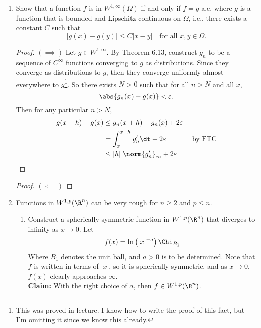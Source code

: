 \documentclass[12pt,letterpaper]{article}
\renewcommand{\epsilon}{\varepsilon}
\begin{document}
\begin{enumerate}
\pagebreak
\item Show that a function $f$ is in $W^{1,\infty}(\Omega)$ if and only if $f=g$ a.e. where $g$ is a function that is bounded and Lipschitz continuous on $\Omega$, i.e., there exists a constant $C$ such that
$$|g(x)-g(y)|\leq C|x-y| \quad \text{for all } x,y\in\Omega.$$

\begin{proof}$(\implies)$
Let $g\in W^{1,\infty}$. By Theorem 6.13, construct $g_n$ to be a sequence of $C^\infty$ functions converging to $g$ as distributions. Since they converge as distributions to $g$, then they converge uniformly almost everywhere to $g$\footnote{This was proved in lecture. I know how to write the proof of this fact, but I'm omitting it since we know this already.}. So there exists $N>0$ such that for all $n>N$ and all $x$, 
$$\abs{g_n(x)-g(x)}<\epsilon.$$
Then for any particular $n>N$, 
\begin{align*}
g(x+h)-g(x)&\leq g_n(x+h)-g_n(x)+2\epsilon \\
&= \int_x^{x+h} g'_n \dt + 2\epsilon & \text{ by FTC} \\
&\leq |h| \; \norm{g'_n}_\infty +2\epsilon 
\end{align*}\qedwhitehere
\end{proof}

\begin{proof}$(\impliedby)$
\end{proof}





\setcounter{enumi}{10}
\item Functions in $W^{1,p}(\Rn)$ can be very rough for $n\geq 2$ and $p\leq n$. 
	\begin{enumerate}[label=(\alph*)]
	\item Construct a spherically symmetric function in $W^{1,p}(\Rn)$ that diverges
to infinity as $x\to 0$. 
	\answer Let 
	$$f(x)=\ln\left(|x|^{-a}\right)\Chi_{B_1}$$
	Where $B_1$ denotes the unit ball, and $a>0$ is to be determined. Note that $f$ is written in terms of $|x|$, so it is spherically symmetric, and as $x\to0$, $f(x)$ clearly approaches $\infty$. \\
	\textbf{Claim:} With the right choice of $a$, then $f\in W^{1,p}(\R^n)$. \
	

\end{enumerate}
\end{enumerate}
\end{document}
